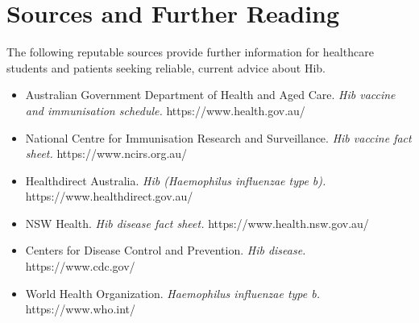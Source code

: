 \section*{Sources and Further Reading}
The following reputable sources provide further information for healthcare students and patients seeking reliable, current advice about Hib.

\begin{itemize}
    \item Australian Government Department of Health and Aged Care. \textit{Hib vaccine and immunisation schedule.} https://www.health.gov.au/
    \item National Centre for Immunisation Research and Surveillance. \textit{Hib vaccine fact sheet.} https://www.ncirs.org.au/
    \item Healthdirect Australia. \textit{Hib (Haemophilus influenzae type b).} https://www.healthdirect.gov.au/
    \item NSW Health. \textit{Hib disease fact sheet.} https://www.health.nsw.gov.au/
    \item Centers for Disease Control and Prevention. \textit{Hib disease.} https://www.cdc.gov/
    \item World Health Organization. \textit{Haemophilus influenzae type b.} https://www.who.int/
\end{itemize}
